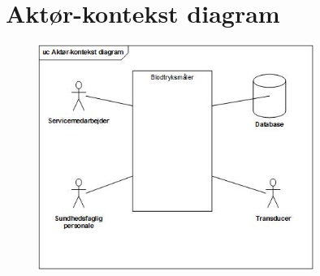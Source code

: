 \section{Aktør-kontekst diagram}
\begin{figure}[h!]
\includegraphics[width =0.8\textwidth , left]{billeder/Aktorkontekst.jpg}
\end{figure}

\newpage


